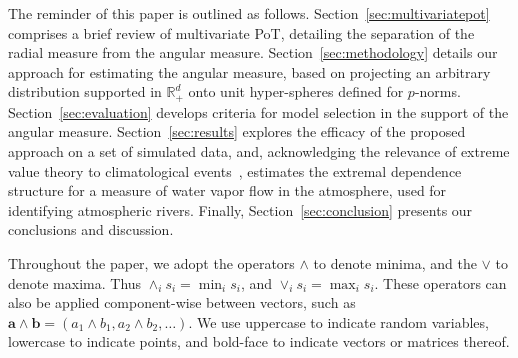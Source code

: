 The reminder of this paper is outlined as follows. 
    Section~\ref{sec:multivariatepot} comprises a brief review of multivariate PoT, 
      detailing the separation of the radial measure from the angular measure.
    Section~\ref{sec:methodology} details our approach for estimating the angular 
      measure, based on projecting an arbitrary distribution supported in ${\mathbb R}_+^d$ 
      onto unit hyper-spheres defined for $p$-norms. 
    Section~\ref{sec:evaluation} develops criteria for model selection in the support 
      of the angular measure.  
    Section~\ref{sec:results} explores the efficacy of the proposed approach on a set 
      of simulated data, and, acknowledging the relevance of extreme value theory to 
      climatological events~\citep{jentsch2007,vousdoukas2018,li2019}, estimates the 
      extremal dependence structure for a measure of water vapor flow in the atmosphere, 
      used for identifying atmospheric rivers.  
    Finally, Section~\ref{sec:conclusion} presents our conclusions and discussion.

Throughout the paper, we adopt the operators $\wedge$ to denote minima, and 
    the $\vee$ to denote maxima.  Thus $\wedge_i s_i = \min_i s_i$, and 
    $\vee_i s_i = \max_i s_i$.  These operators can also be applied component-wise 
    between vectors, such as $\bm{a}\wedge\bm{b} = (a_1\wedge b_1, a_2\wedge b_2,\ldots)$.  
    We use uppercase to indicate random variables, lowercase to indicate points, and
    bold-face to indicate vectors or matrices thereof.
  
